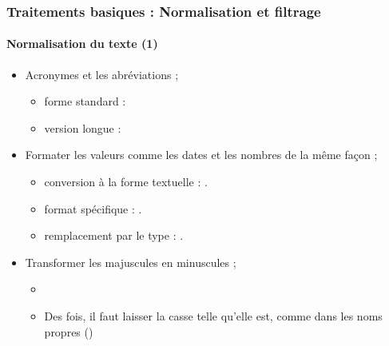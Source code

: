 \documentclass[xcolor=table]{beamer}
\begin{document}
\begin{frame}
\frametitle{Traitements basiques : Normalisation et filtrage}
\framesubtitle{Normalisation du texte (1)}

\begin{itemize}
	
	\item Acronymes et les abréviations ;
	\begin{itemize}
		\item forme standard : 
		\item version longue : 
	\end{itemize}
	
	\item Formater les valeurs comme les dates et les nombres de la même façon ;
	\begin{itemize}
		\item conversion à la forme textuelle : .
		\item format spécifique : .
		\item remplacement par le type : .
	\end{itemize}
	
	\item Transformer les majuscules en minuscules ;
	\begin{itemize}
		\item {}
		\item Des fois, il faut laisser la casse telle qu'elle est, comme dans les noms propres ()
	\end{itemize}
\end{itemize}

\end{frame}
\end{document}
